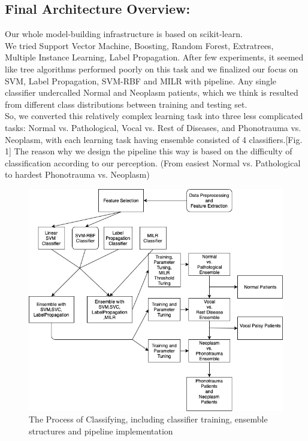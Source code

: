 \subsection{Final Architecture Overview:}
	Our whole model-building infrastructure is based on scikit-learn\cite{b7}\cite{b8}. \\
	\indent We tried Support Vector Machine, Boosting, Random Forest, Extratrees, Multiple Instance Learning, Label Propagation. After few experiments, it seemed like tree algorithms performed poorly on this task and we finalized our focus on SVM, Label Propagation, SVM-RBF and MILR with pipeline. Any single classifier undercalled Normal and Neoplasm patients, which we think is resulted from different class distributions between training and testing set. \\
\indent So, we converted this relatively complex learning task into three less complicated tasks: Normal vs. Pathological, Vocal vs. Rest of Diseases, and Phonotrauma vs. Neoplasm, with each learning task having ensemble consisted of 4 classifiers.[Fig. 1] The reason why we design the pipeline this way is based on the difficulty of classification according to our perception. (From easiest Normal vs. Pathological to hardest Phonotrauma vs. Neoplasm)\\
	\begin{figure}[!htbp]
		\begin{center}
			\includegraphics[scale=0.35]{Diagram_3.png}
		\end{center}
		\caption{The Process of Classifying, including classifier training, ensemble structures and pipeline implementation}
	\end{figure}

